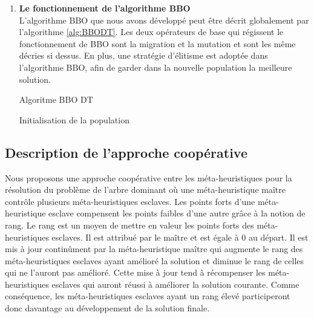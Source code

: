 \begin{enumerate}
\begin{enumerate}[label=\alph*)]
	\end{enumerate}	

	
	\item \textbf{Le fonctionnement de l’algorithme BBO}\\
	L’algorithme BBO que nous avons développé peut être décrit globalement par l’algorithme \ref{alg:BBODT}. Les deux opérateurs de base qui régissent le fonctionnement de BBO sont la migration et la mutation et sont les même décries si dessus. En plus, une stratégie d’élitisme est adoptée dans l’algorithme BBO, afin de garder dans la nouvelle population la meilleure solution.

\begin{algorithm}[H]
\label{alg:BBODT}
\caption{Algoritme BBO DT}
\SetAlgoLined
\DontPrintSemicolon

Initialisation de la population \;

\end{algorithm}

	
\end{enumerate}



\subsection{Description de l'approche coopérative}
Nous proposons une approche  coopérative entre les méta-heuristiques pour la résolution du problème de l’arbre dominant où une méta-heuristique maître contrôle plusieurs méta-heuristiques esclaves. Les points forts d'une méta-heuristique esclave compensent les points faibles d'une autre grâce à la notion de rang. Le rang est un moyen de mettre en valeur les points forts des méta-heuristiques esclaves. Il est attribué par le maître et est égale à 0 au départ. Il est mis à jour continûment par la méta-heuristique maître qui augmente le rang des méta-heuristiques esclaves ayant amélioré la solution et diminue le rang de celles qui ne l'auront pas amélioré. Cette mise à jour tend à récompenser les méta-heuristiques esclaves qui auront réussi à améliorer la solution courante. Comme conséquence, les méta-heuristiques esclaves ayant un rang élevé participeront donc davantage au développement de la solution finale.


